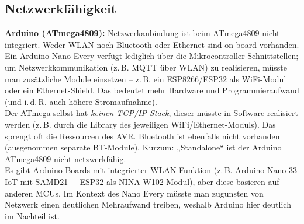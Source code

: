 \subsection{Netzwerkfähigkeit}

\textbf{Arduino (ATmega4809):} Netzwerkanbindung ist beim ATmega4809 nicht integriert. Weder WLAN noch Bluetooth oder Ethernet sind on-board vorhanden. Ein Arduino Nano Every verfügt lediglich über die Mikrocontroller-Schnittstellen; um Netzwerkkommunikation (z.\,B. MQTT über WLAN) zu realisieren, müsste man zusätzliche Module einsetzen – z.\,B. ein ESP8266/ESP32 als WiFi-Modul oder ein Ethernet-Shield. Das bedeutet mehr Hardware und Programmieraufwand (und i.\,d.\,R. auch höhere Stromaufnahme). 
\\
Der ATmega selbst hat \textit{keinen TCP/IP-Stack}, dieser müsste in Software realisiert werden (z.\,B. durch die Library des jeweiligen WiFi/Ethernet-Moduls). Das sprengt oft die Ressourcen des AVR. Bluetooth ist ebenfalls nicht vorhanden (ausgenommen separate BT-Module). Kurzum: „Standalone“ ist der Arduino ATmega4809 nicht netzwerkfähig. \autocite{esp_comparison_2} 
\\
Es gibt Arduino-Boards mit integrierter WLAN-Funktion (z.\,B. Arduino Nano 33 IoT mit SAMD21 + ESP32 als NINA-W102 Modul), aber diese basieren auf anderen MCUs. Im Kontext des Nano Every müsste man zugunsten von Netzwerk einen deutlichen Mehraufwand treiben, weshalb Arduino hier deutlich im Nachteil ist.


\vspace{5mm}

